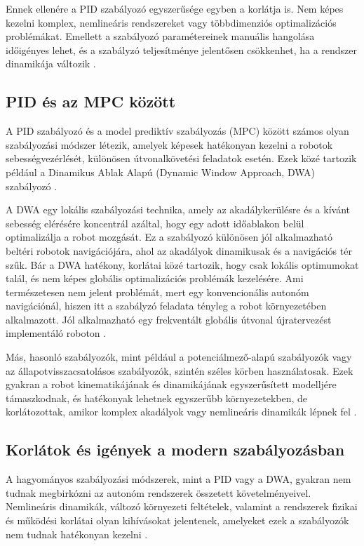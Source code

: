 Ennek ellenére a PID szabályozó egyszerűsége egyben a korlátja is. Nem képes kezelni komplex, nemlineáris rendszereket vagy többdimenziós optimalizációs problémákat. Emellett a szabályozó paramétereinek manuális hangolása időigényes lehet, és a szabályzó teljesítménye jelentősen csökkenhet, ha a rendszer dinamikája változik \cite{ogata_modern_ce}.

\subsection{PID és az MPC között}
A PID szabályozó és a model prediktív szabályozás (MPC) között számos olyan szabályozási módszer létezik, amelyek képesek hatékonyan kezelni a robotok sebességvezérlését, különösen útvonalkövetési feladatok esetén. Ezek közé tartozik például a Dinamikus Ablak Alapú (Dynamic Window Approach, DWA) szabályozó \cite{fox_dynamic}.

A DWA egy lokális szabályozási technika, amely az akadálykerülésre és a kívánt sebesség elérésére koncentrál azáltal, hogy egy adott időablakon belül optimalizálja a robot mozgását. Ez a szabályozó különösen jól alkalmazható beltéri robotok navigációjára, ahol az akadályok dinamikusak és a navigációs tér szűk. Bár a DWA hatékony, korlátai közé tartozik, hogy csak lokális optimumokat talál, és nem képes globális optimalizációs problémák kezelésére. Ami természetesen nem jelent problémát, mert egy konvencionális autonóm navigációnál, hiszen itt a szabályzó feladata tényleg a robot környezetében alkalmazott. Jól alkalmazható egy frekventált globális útvonal újratervezést implementáló roboton \cite{siciliano_springer_handbook}.

Más, hasonló szabályozók, mint például a potenciálmező-alapú szabályozók vagy az állapotvisszacsatolásos szabályozók, szintén széles körben használatosak. Ezek gyakran a robot kinematikájának és dinamikájának egyszerűsített modelljére támaszkodnak, és hatékonyak lehetnek egyszerűbb környezetekben, de korlátozottak, amikor komplex akadályok vagy nemlineáris dinamikák lépnek fel \cite{latombe_robot}.

\subsection{Korlátok és igények a modern szabályozásban}
A hagyományos szabályozási módszerek, mint a PID vagy a DWA, gyakran nem tudnak megbirkózni az autonóm rendszerek összetett követelményeivel. Nemlineáris dinamikák, változó környezeti feltételek, valamint a rendszerek fizikai és működési korlátai olyan kihívásokat jelentenek, amelyeket ezek a szabályozók nem tudnak hatékonyan kezelni \cite{rawlings_model}.

